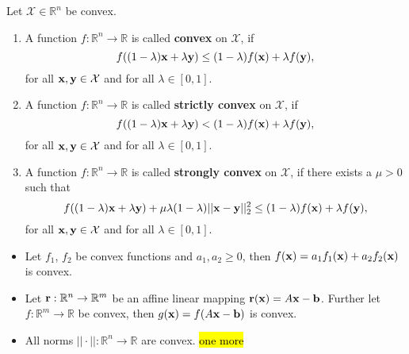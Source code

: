 \documentclass{article}
\begin{document}
\begin{definition}[Convexity]
    Let $\mathcal{X}\in\mathbb{R}^n$ be convex.
    \begin{enumerate}
        \item A function $f:\mathbb{R}^n\rightarrow\mathbb{R}$ is called \textbf{convex} on $\mathcal{X}$, if
        \begin{equation}
            f((1-\lambda)\bm{\mathrm{x}}+\lambda\bm{\mathrm{y}})\leq(1-\lambda)f(\bm{\mathrm{x}})+\lambda f(\bm{\mathrm{y}}),
        \end{equation}
        for all $\bm{\mathrm{x}},\bm{\mathrm{y}}\in\mathcal{X}$ and for all $\lambda\in[0,1]$.
        \item A function $f:\mathbb{R}^n\rightarrow\mathbb{R}$ is called \textbf{strictly convex} on $\mathcal{X}$, if
        \begin{equation}
            f((1-\lambda)\bm{\mathrm{x}}+\lambda\bm{\mathrm{y}}) < (1-\lambda)f(\bm{\mathrm{x}})+\lambda f(\bm{\mathrm{y}}),
        \end{equation}
        for all $\bm{\mathrm{x}},\bm{\mathrm{y}}\in\mathcal{X}$ and for all $\lambda\in[0,1]$.
        \item A function $f:\mathbb{R}^n\rightarrow\mathbb{R}$ is called \textbf{strongly convex} on $\mathcal{X}$, if there exists a $\mu>0$ such that
        \begin{equation}
            f((1-\lambda)\bm{\mathrm{x}}+\lambda\bm{\mathrm{y}}) +\mu\lambda(1-\lambda)||\bm{\mathrm{x}}-\bm{\mathrm{y}}||_2^2 \leq(1-\lambda)f(\bm{\mathrm{x}})+\lambda f(\bm{\mathrm{y}}),
        \end{equation}
        for all $\bm{\mathrm{x}},\bm{\mathrm{y}}\in\mathcal{X}$ and for all $\lambda\in[0,1]$.
    \end{enumerate}
\end{definition}

\begin{property}
    \begin{itemize}
        \item Let $f_1$, $f_2$ be convex functions and $a_1,a_2\geq0$, then $f(\bm{\mathrm{x}})=a_1f_1(\bm{\mathrm{x}})+a_2f_2(\bm{\mathrm{x}})$ is convex.
        \item Let $\bm{\mathrm{r}}:\mathbb{R}^n\rightarrow\mathbb{R}^m$ be an affine linear mapping $\bm{\mathrm{r}}(\bm{\mathrm{x}})=A\bm{\mathrm{x}}-\bm{\mathrm{b}}$. Further let $f:\mathbb{R}^m\rightarrow\mathbb{R}$ be convex, then $g(\bm{\mathrm{x}})=f(A\bm{\mathrm{x}}-\bm{\mathrm{b}})$ is convex.
        \item All norms $||\cdot||:\mathbb{R}^n\rightarrow\mathbb{R}$ are convex.
        \hl{one more}
    \end{itemize}
\end{property}
\end{document}
